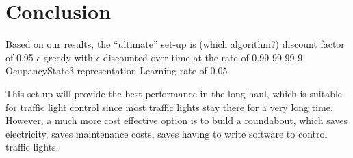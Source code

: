 \section {Conclusion}

Based on our results, the ``ultimate'' set-up is
(which algorithm?)
discount factor of 0.95
$\epsilon$-greedy with $\epsilon$ discounted over time at the rate of 0.99 99 99 9
OcupancyState3 representation
Learning rate of 0.05

This set-up will provide the best performance in the long-haul, which is
suitable for traffic light control since most traffic lights stay there
for a very long time. However, a much more cost effective
option is to build a roundabout, which saves electricity, saves maintenance
costs, saves having to write software to control traffic lights.
